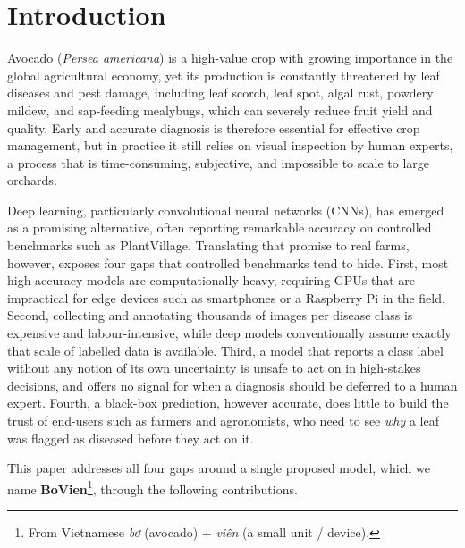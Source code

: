 \section{Introduction}
\label{sec:introduction}

Avocado (\emph{Persea americana}) is a high-value crop with growing importance in the global agricultural economy, yet its production is constantly threatened by leaf diseases and pest damage, including leaf scorch, leaf spot, algal rust, powdery mildew, and sap-feeding mealybugs, which can severely reduce fruit yield and quality. Early and accurate diagnosis is therefore essential for effective crop management, but in practice it still relies on visual inspection by human experts, a process that is time-consuming, subjective, and impossible to scale to large orchards.

Deep learning, particularly convolutional neural networks (CNNs), has emerged as a promising alternative, often reporting remarkable accuracy on controlled benchmarks such as PlantVillage. Translating that promise to real farms, however, exposes four gaps that controlled benchmarks tend to hide. First, most high-accuracy models are computationally heavy, requiring GPUs that are impractical for edge devices such as smartphones or a Raspberry Pi in the field. Second, collecting and annotating thousands of images per disease class is expensive and labour-intensive, while deep models conventionally assume exactly that scale of labelled data is available. Third, a model that reports a class label without any notion of its own uncertainty is unsafe to act on in high-stakes decisions, and offers no signal for when a diagnosis should be deferred to a human expert. Fourth, a black-box prediction, however accurate, does little to build the trust of end-users such as farmers and agronomists, who need to see \emph{why} a leaf was flagged as diseased before they act on it.

This paper addresses all four gaps around a single proposed model, which we name \textbf{BoVien}\footnote{From Vietnamese \emph{bơ} (avocado) + \emph{viên} (a small unit / device).}, through the following contributions.

